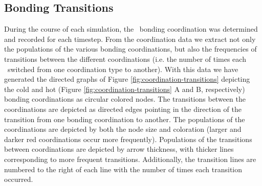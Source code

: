 \documentclass{article}
\begin{document}
\subsection {Bonding Transitions}

During the course of each simulation, the \suldiox~bonding coordination was determined and recorded for each timestep. From the coordination data we extract not only the populations of the various bonding coordinations, but also the frequencies of transitions between the different coordinations (i.e. the number of times each \suldiox~switched from one coordination type to another). With this data we have generated the directed graphs of Figure \ref{fig:coordination-transitions} depicting the cold and hot (Figure \ref{fig:coordination-transitions} A and B, respectively) bonding coordinations as circular colored nodes.\cite{Ellson2004,Gansner1999} The transitions between the coordinations are depicted as directed edges pointing in the direction of the transition from one bonding coordination to another. The populations of the coordinations are depicted by both the node size and coloration (larger and darker red coordinations occur more frequently). Populations of the transitions between coordinations are depicted by arrow thickness, with thicker lines corresponding to more frequent transitions. Additionally, the transition lines are numbered to the right of each line with the number of times each transition occurred. 
\end{document}
